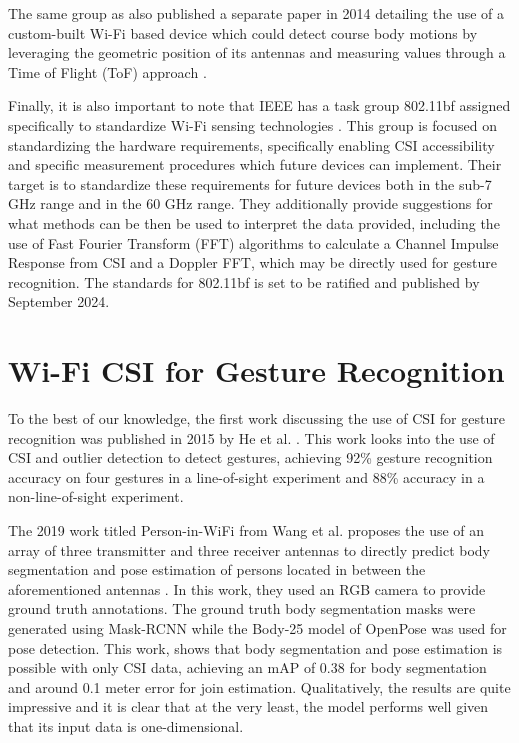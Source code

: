 The same group as \cite{adib2013see} also published a separate paper in 2014 detailing the use of a custom-built Wi-Fi based device which could detect course body motions by leveraging the geometric position of its antennas and measuring values through a Time of Flight (ToF) approach \cite{adib20143d}.

Finally, it is also important to note that IEEE has a task group 802.11bf assigned specifically to standardize Wi-Fi sensing technologies \cite{du2022overview}.
This group is focused on standardizing the hardware requirements, specifically enabling CSI accessibility and specific measurement procedures which future devices can implement.
Their target is to standardize these requirements for future devices both in the sub-7 GHz range and in the 60 GHz range.
They additionally provide suggestions for what methods can be then be used to interpret the data provided, including the use of Fast Fourier Transform (FFT) algorithms to calculate a Channel Impulse Response from CSI and a Doppler FFT, which may be directly used for gesture recognition.
The standards for 802.11bf is set to be ratified and published by September 2024.

\section{Wi-Fi CSI for Gesture Recognition}

To the best of our knowledge, the first work discussing the use of CSI for gesture recognition was published in 2015 by He et al. \cite{he2015wig}.
This work looks into the use of CSI and outlier detection to detect gestures, achieving 92\% gesture recognition accuracy on four gestures in a line-of-sight experiment and 88\% accuracy in a non-line-of-sight experiment.

The 2019 work titled Person-in-WiFi from Wang et al. proposes the use of an array of three transmitter and three receiver antennas to directly predict body segmentation and pose estimation of persons located in between the aforementioned antennas \cite{wang2019person}.
In this work, they used an RGB camera to provide ground truth annotations.
The ground truth body segmentation masks were generated using Mask-RCNN while the Body-25 model of OpenPose was used for pose detection.
This work, shows that body segmentation and pose estimation is possible with only CSI data, achieving an mAP of 0.38 for body segmentation and around 0.1 meter error for join estimation. 
Qualitatively, the results are quite impressive and it is clear that at the very least, the model performs well given that its input data is one-dimensional.

